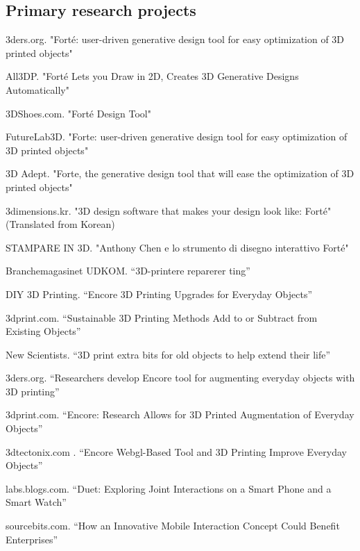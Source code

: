 \subsection{Primary research projects}

 {
	3ders.org. "Forté: user-driven generative design tool for easy optimization of 3D printed objects"
}

 {
	All3DP. "Forté Lets you Draw in 2D, Creates 3D Generative Designs Automatically"
}

 {
	3DShoes.com. "Forté Design Tool"
}

 {
	FutureLab3D. "Forte: user-driven generative design tool for easy optimization of 3D printed objects"
}

 {
	3D Adept. "Forte, the generative design tool that will ease the optimization of 3D printed objects"
}

 {
	3dimensions.kr. "3D design software that makes your design look like: Forté" (Translated from Korean)
}

 {
	STAMPARE IN 3D. "Anthony Chen e lo strumento di disegno interattivo Forté"
}

 {
	Branchemagasinet UDKOM. “3D-printere reparerer ting” 
}

 {
	DIY 3D Printing. “Encore 3D Printing Upgrades for Everyday Objects”
}

 {
	3dprint.com. “Sustainable 3D Printing Methods Add to or Subtract from Existing Objects”
}

 {
	New Scientists. “3D print extra bits for old objects to help extend their life” 
}

 {
	3ders.org. “Researchers develop Encore tool for augmenting everyday objects with 3D printing” 
}

 {
	3dprint.com. “Encore: Research Allows for 3D Printed Augmentation of Everyday Objects”
}

 {
	3dtectonix.com . “Encore Webgl-Based Tool and 3D Printing Improve Everyday Objects”
}

 {
	labs.blogs.com. “Duet: Exploring Joint Interactions on a Smart Phone and a Smart Watch” 
}

 {
	sourcebits.com. “How an Innovative Mobile Interaction Concept Could Benefit Enterprises”
}

